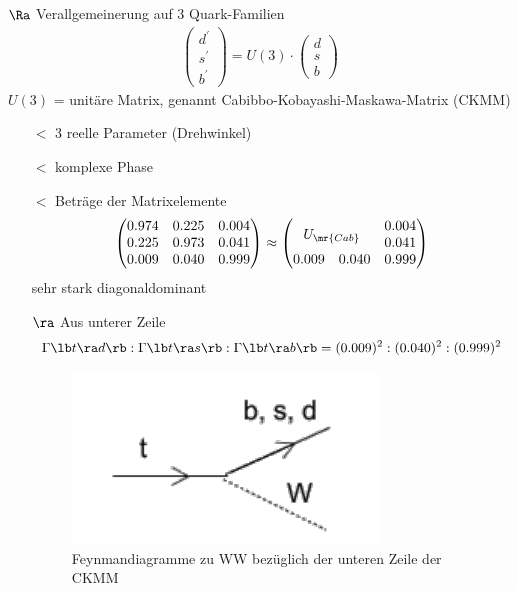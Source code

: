 \begin{itemize}
\begin{itemize}
$\Ra$ Verallgemeinerung auf 3 Quark-Familien
\begin{align}
\boxed{ \begin{pmatrix}
d^\prime \\ s^\prime \\ b^\prime 
\end{pmatrix} = U(3) \cdot \begin{pmatrix}
d \\ s\\ b
\end{pmatrix} }
\end{align}
$U(3)$ = unitäre Matrix, genannt Cabibbo-Kobayashi-Maskawa-Matrix (CKMM)
\begin{itemize}
\item[$\lt$] 3 reelle Parameter (\glqq Drehwinkel\grqq{})
\item[$\lt$] komplexe Phase
\item[$\lt$] Beträge der Matrixelemente
\begin{align}
\begin{pmatrix}
0.974 & 0.225 & 0.004 \\
0.225 & 0.973 & 0.041\\
0.009 & 0.040 & 0.999
\end{pmatrix} \approx \begin{pmatrix}
U_\mr{Cab} & \begin{matrix}
0.004 \\ 0.041
\end{matrix} \\
\begin{matrix}
0.009 & 0.040
\end{matrix} & 0.999
\end{pmatrix}
\end{align}
sehr stark diagonaldominant
\item[$\ra$]  Aus unterer Zeile
\begin{align*}
\Gamma \lb  t \ra d\rb : \Gamma \lb t \ra s\rb  : \Gamma\lb t \ra b\rb  = (0.009)^2 : (0.040)^2 : (0.999)^2
\end{align*}

\begin{figure}[!ht]
\centering
\includegraphics[width=.5\textwidth]{imgs/ep5-fig-8-4.pdf}
\caption{Feynmandiagramme zu WW bezüglich der unteren Zeile der CKMM \label{fig:8.4}}
\end{figure}
\end{itemize}
\end{itemize}
\end{itemize}
